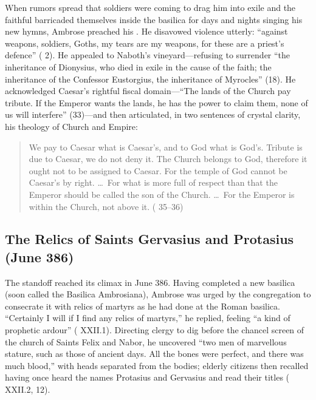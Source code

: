 When rumors spread that soldiers were coming to drag him into exile and the faithful barricaded themselves inside the basilica for days and nights singing his new hymns, Ambrose preached his . He disavowed violence utterly: ``against weapons, soldiers, Goths, my tears are my weapons, for these are a priest's defence'' ( 2). He appealed to Naboth's vineyard---refusing to surrender ``the inheritance of Dionysius, who died in exile in the cause of the faith; the inheritance of the Confessor Eustorgius, the inheritance of Myrocles'' (18). He acknowledged Caesar's rightful fiscal domain---``The lands of the Church pay tribute. If the Emperor wants the lands, he has the power to claim them, none of us will interfere'' (33)---and then articulated, in two sentences of crystal clarity, his theology of Church and Empire:

\begin{quote}
We pay to Caesar what is Caesar's, and to God what is God's. Tribute is due to Caesar, we do not deny it. The Church belongs to God, therefore it ought not to be assigned to Caesar. For the temple of God cannot be Caesar's by right. \ldots\ For what is more full of respect than that the Emperor should be called the son of the Church. \ldots\ For the Emperor is within the Church, not above it. ( 35--36)
\end{quote}

\subsection{The Relics of Saints Gervasius and Protasius (June 386)}

The standoff reached its climax in June 386. Having completed a new basilica (soon called the Basilica Ambrosiana), Ambrose was urged by the congregation to consecrate it with relics of martyrs as he had done at the Roman basilica. ``Certainly I will if I find any relics of martyrs,'' he replied, feeling ``a kind of prophetic ardour'' ( XXII.1). Directing clergy to dig before the chancel screen of the church of Saints Felix and Nabor, he uncovered ``two men of marvellous stature, such as those of ancient days. All the bones were perfect, and there was much blood,'' with heads separated from the bodies; elderly citizens then recalled having once heard the names Protasius and Gervasius and read their titles ( XXII.2, 12).

